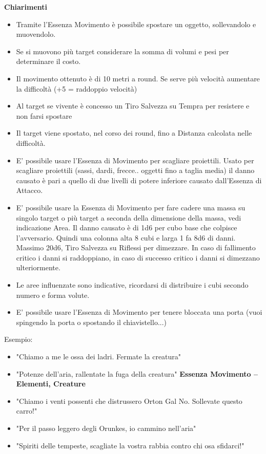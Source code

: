 \documentclass[a4paper,10 pt,twoside,openany]{book}
\begin{document}
\textbf{Chiarimenti}
\begin{itemize}
	\item
	Tramite l'Essenza Movimento è possibile spostare un oggetto, sollevandolo e muovendolo.
	\item
	Se si muovono più target considerare la somma di volumi e pesi per determinare il costo.
	\item
	Il movimento ottenuto è di 10 metri a round. Se serve più velocità aumentare la difficoltà (+5 = raddoppio velocità)
	\item
	Al target se vivente è concesso un Tiro Salvezza su Tempra per resistere e non farsi spostare
	\item
	Il target viene spostato, nel corso dei round, fino a Distanza calcolata nelle difficoltà.
	\item
	E' possibile usare l'Essenza di Movimento per scagliare proiettili. Usato per scagliare proiettili (sassi, dardi, frecce.. oggetti fino a taglia media) il danno causato è pari a quello di due livelli di potere inferiore causato dall'Essenza di Attacco.
	\item
	E' possibile usare la Essenza di Movimento per fare cadere una massa su singolo target o più target a seconda della dimensione della massa, vedi indicazione Area. Il danno causato è di 1d6 per cubo base che colpisce l'avversario. Quindi una colonna alta 8 cubi e larga 1 fa 8d6 di danni. Massimo 20d6, Tiro Salvezza su Riflessi per dimezzare. In caso di fallimento critico i danni si raddoppiano, in caso di successo critico i danni si dimezzano ulteriormente.
	\item
	Le aree influenzate sono indicative, ricordarsi di distribuire i cubi secondo numero e forma volute.

	\item E' possibile usare l'Essenza di Movimento per tenere bloccata una porta (vuoi spingendo la porta o spostando il chiavistello...)

\end{itemize}
\bigskip


Esempio:
\begin{itemize}
	\item 	"Chiamo a me le ossa dei ladri. Fermate la creatura"
	\item 	"Potenze dell'aria, rallentate la fuga della creatura"
	\textbf{Essenza Movimento -- Elementi, Creature}
	\item "Chiamo i venti possenti che distrussero Orton Gal No. Sollevate questo carro!"
	\item "Per il passo leggero degli Orunkes, io cammino nell'aria"
	\item "Spiriti delle tempeste, scagliate la vostra rabbia contro chi osa sfidarci!"
\end{itemize}
\end{document}
